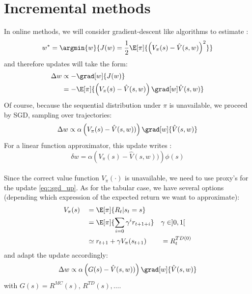 \documentclass[a4paper]{article}
\newcommand\vhat{\hat{V}(s,w)}
\begin{document}
	\section{Incremental methods}
	{
		In online methods, we will consider gradient-descent like algorithms to estimate : 
		\begin{equation}
			w^* = \argmin{w}{J(w) = \frac{1}{2} \E[\pi]{\left(V_\pi(s)-\hat{V}(s,w)\right)^2}}
		\end{equation}
		and therefore updates will take the form:
		\begin{equation}
			\begin{aligned}
				\Delta w &\propto -\grad[w]{J(w)}\\
					      &= -\E[\pi]{\left(V_\pi(s)-\vhat\right)\grad[w]\vhat}
			\end{aligned}
		\end{equation}
		Of course, because the sequential distribution under $\pi$ is unavailable, we proceed by SGD, sampling over trajectories:
		\begin{equation}
			\Delta w \propto \alpha\left(V_\pi(s)-\vhat)\right)\grad[w]{\vhat}
			\label{eq::sgd_up}
		\end{equation}
		For a linear function approximator, this update writes : 
		\begin{equation}
			\delta w = \alpha\left(V_\pi(s)-\vhat)\right)\phi(s)
		\end{equation}
	
	
	
	\paragraph{} Since the correct value function $V_\pi(\cdot)$ is unavailable, we need to use proxy's for the update \eqref{eq::sgd_up}. As for the tabular case, we have several options (depending which expression of the expected return we want to approximate): 
	\begin{equation}
		\begin{aligned}
			&V_\pi(s) & &= \E[\pi]{R_t\vert s_t=s} & & \\
			& & & =\E[\pi]{\sum_{i=0}\gamma^i r_{t+1+i}} & & \gamma\in]0,1[ \\
			& & & \simeq r_{t+1} + \gamma V_\pi(s_{t+1}) & &=R^{TD(0)}_t
		\end{aligned}
	\end{equation}
	and adapt the update accordingly:
	\begin{equation}
		\Delta w \propto \alpha\left(G(s)-\vhat)\right)\grad[w]{\vhat}
	\end{equation}
	with $G(s) = R^{MC}(s), \, R^{TD}(s), \hdots$. 
	
}
\end{document}
